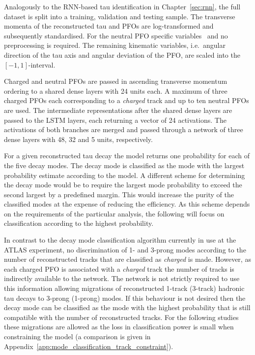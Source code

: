 Analogously to the RNN-based tau identification in Chapter~\ref{sec:rnn}, the
full dataset is split into a training, validation and testing sample. The
transverse momenta of the reconstructed tau and PFOs are log-transformed and
subsequently standardised. For the neutral PFO specific
variables~ and  no
preprocessing is required. The remaining kinematic variables, i.e.\ angular
direction of the tau axis and angular deviation of the PFO, are scaled into
the~$[-1, 1]$-interval.

Charged and neutral PFOs are passed in ascending transverse momentum ordering to
a shared dense layers with 24 units each. A maximum of three charged PFOs each
corresponding to a \emph{charged} track and up to ten neutral PFOs are used. The
intermediate representations after the shared dense layers are passed to the
LSTM layers, each returning a vector of 24 activations. The activations of both
branches are merged and passed through a network of three dense layers with 48,
32 and 5 units, respectively.

For a given reconstructed tau decay the model returns one probability for each
of the five decay modes. The decay mode is classified as the mode with the
largest probability estimate according to the model. A different scheme for
determining the decay mode would be to require the largest mode probability to
exceed the second largest by a predefined margin. This would increase the purity
of the classified modes at the expense of reducing the efficiency. As this
scheme depends on the requirements of the particular analysis, the following
will focus on classification according to the highest probability.

In contrast to the decay mode classification algorithm currently in use at the
ATLAS experiment, no discrimination of 1- and 3-prong modes according to the
number of reconstructed tracks that are classified as \emph{charged} is made.
However, as each charged PFO is associated with a \emph{charged} track the
number of tracks is indirectly available to the network. The network is not
strictly required to use this information allowing migrations of reconstructed
1-track (3-track) hadronic tau decays to 3-prong (1-prong) modes. If this
behaviour is not desired then the decay mode can be classified as the mode with
the highest probability that is still compatible with the number of
reconstructed tracks. For the following studies these migrations are allowed as
the loss in classification power is small when constraining the model (a
comparison is given in Appendix~\ref{app:mode_classification_track_constraint}).

